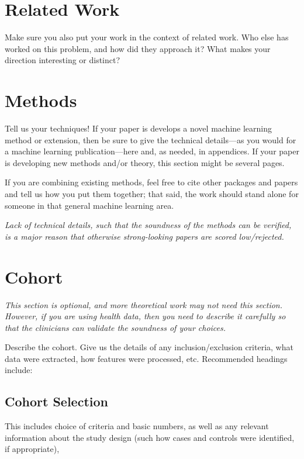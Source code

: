 \documentclass[pmlr]{jmlr}%
\begin{document}
\section{Related Work}

Make sure you also put your work in the context of related
work.  Who else has worked on this problem, and how did they approach
it?  What makes your direction interesting or distinct?


\section{Methods}

Tell us your techniques!  If your paper is develops a novel machine
learning method or extension, then be sure to give the technical
details---as you would for a machine learning publication---here and,
as needed, in appendices.  If your paper is developing new methods
and/or theory, this section might be several pages.

If you are combining existing methods, feel free to cite other
packages and papers and tell us how you put them together; that said,
the work should stand alone for someone in that general machine
learning area.  

\emph{Lack of technical details, such that the soundness of the
  methods can be verified, is a major reason that otherwise
  strong-looking papers are scored low/rejected.}

\section{Cohort}

\emph{This section is optional, and more theoretical work may not need
  this section.  However, if you are using health data, then you need
  to describe it carefully so that the clinicians can validate the
  soundness of your choices.} 

Describe the cohort.  Give us the details of any inclusion/exclusion
criteria, what data were extracted, how features were processed,
etc.  Recommended headings include:

\subsection{Cohort Selection} 
This includes choice of criteria and basic numbers, as well as any relevant
information about the study design (such how cases and controls were
identified, if appropriate), 
\end{document}
